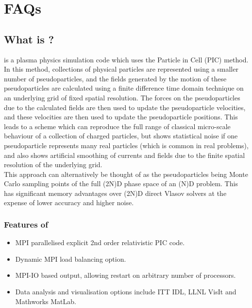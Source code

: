 \documentclass[12pt,a4paper]{article}
\newcommand{\EPOCH}{{\color{warwickdark}\fontfamily{phv}\selectfont{EPOCH}}}
\begin{document}
{
  \selectfont
}
\selectfont%
\tableofcontents%
\newpage%
\DefineShortVerb{\#}

\section{FAQs}

\subsection{What is {\EPOCH}?}
{\EPOCH} is a plasma physics simulation code which uses the Particle in Cell
(PIC) method. In this method, collections of physical particles are represented
using a smaller number of pseudoparticles, and the fields generated by the
motion of these pseudoparticles are calculated using a finite difference time
domain technique on an underlying grid of fixed spatial resolution. The forces
on the pseudoparticles due to the calculated fields are then used to update the
pseudoparticle velocities, and these velocities are then used to update the
pseudoparticle positions. This leads to a scheme which can reproduce the full
range of classical micro-scale behaviour of a collection of charged particles,
but shows statistical noise if one pseudoparticle represents many real
particles (which is common in real problems), and also shows artificial
smoothing of currents and fields due to the finite spatial resolution of the
underlying grid.\\

This approach can alternatively be thought of as the pseudoparticles being
Monte Carlo sampling points of the full (2N)D phase space of an (N)D
problem. This has significant memory advantages over (2N)D direct Vlasov
solvers at the expense of lower accuracy and higher noise.

\subsubsection{Features of {\EPOCH}}
\begin{itemize}
  \item MPI parallelised explicit 2nd order relativistic PIC code.
  \item Dynamic MPI load balancing option.
  \item MPI-IO based output, allowing restart on arbitrary number of processors.
  \item Data analysis and visualisation options include ITT IDL, LLNL VisIt
    and Mathworks MatLab.
\end{itemize}
\end{document}
